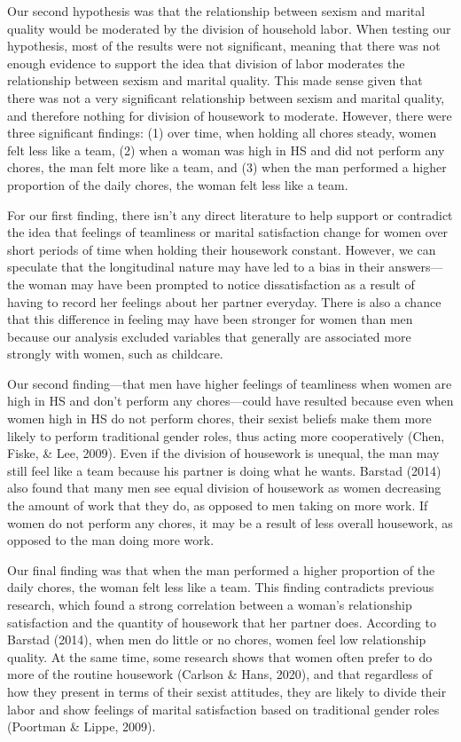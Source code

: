 \documentclass[
  english,
  man]{apa6}
\begin{document}
Our second hypothesis was that the relationship between sexism and marital quality would be moderated by the division of household labor. When testing our hypothesis, most of the results were not significant, meaning that there was not enough evidence to support the idea that division of labor moderates the relationship between sexism and marital quality. This made sense given that there was not a very significant relationship between sexism and marital quality, and therefore nothing for division of housework to moderate. However, there were three significant findings: (1) over time, when holding all chores steady, women felt less like a team, (2) when a woman was high in HS and did not perform any chores, the man felt more like a team, and (3) when the man performed a higher proportion of the daily chores, the woman felt less like a team.

For our first finding, there isn't any direct literature to help support or contradict the idea that feelings of teamliness or marital satisfaction change for women over short periods of time when holding their housework constant. However, we can speculate that the longitudinal nature may have led to a bias in their answers---the woman may have been prompted to notice dissatisfaction as a result of having to record her feelings about her partner everyday. There is also a chance that this difference in feeling may have been stronger for women than men because our analysis excluded variables that generally are associated more strongly with women, such as childcare.

Our second finding---that men have higher feelings of teamliness when women are high in HS and don't perform any chores---could have resulted because even when women high in HS do not perform chores, their sexist beliefs make them more likely to perform traditional gender roles, thus acting more cooperatively (Chen, Fiske, \& Lee, 2009). Even if the division of housework is unequal, the man may still feel like a team because his partner is doing what he wants. Barstad (2014) also found that many men see equal division of housework as women decreasing the amount of work that they do, as opposed to men taking on more work. If women do not perform any chores, it may be a result of less overall housework, as opposed to the man doing more work.

Our final finding was that when the man performed a higher proportion of the daily chores, the woman felt less like a team. This finding contradicts previous research, which found a strong correlation between a woman's relationship satisfaction and the quantity of housework that her partner does. According to Barstad (2014), when men do little or no chores, women feel low relationship quality. At the same time, some research shows that women often prefer to do more of the routine housework (Carlson \& Hans, 2020), and that regardless of how they present in terms of their sexist attitudes, they are likely to divide their labor and show feelings of marital satisfaction based on traditional gender roles (Poortman \& Lippe, 2009).
\end{document}
